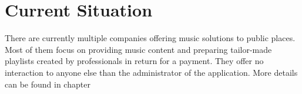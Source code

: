 \section*{Current Situation}

There are currently multiple companies offering music solutions to public places. Most of them focus on providing music content and preparing tailor-made playlists created by professionals in return for a payment. They offer no interaction to anyone else than the administrator of the application. More details can be found in chapter 
